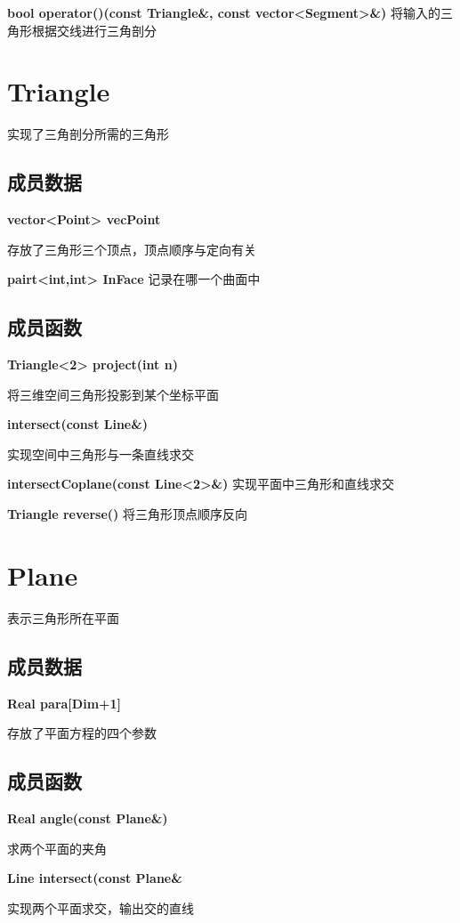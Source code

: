 \documentclass[a4paper]{book}
\numberwithin{equation}{chapter}
\theoremstyle{definition}
\begin{document}
\textbf{bool operator()(const Triangle\&, const vector<Segment>\&)}
将输入的三角形根据交线进行三角剖分


\section{Triangle}
实现了三角剖分所需的三角形


\subsection{成员数据}
\textbf{vector<Point> vecPoint}

存放了三角形三个顶点，顶点顺序与定向有关

\textbf{pairt<int,int> InFace}
记录在哪一个曲面中

\subsection{成员函数}
\textbf{Triangle<2> project(int n)}

将三维空间三角形投影到某个坐标平面

\textbf{intersect(const Line\&)}

实现空间中三角形与一条直线求交

\textbf{intersectCoplane(const Line<2>\&)}
实现平面中三角形和直线求交

\textbf{Triangle reverse()}
将三角形顶点顺序反向


\section{Plane}
表示三角形所在平面


\subsection{成员数据}
\textbf{Real para[Dim+1]}

存放了平面方程的四个参数



\subsection{成员函数}
\textbf{ Real angle(const Plane\&)}

求两个平面的夹角

\textbf{Line intersect(const Plane\&}

实现两个平面求交，输出交的直线
\end{document}
